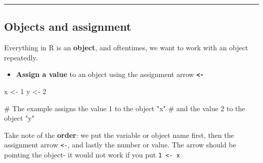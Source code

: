 \documentclass[
  letterpaper,
  DIV=11,
  numbers=noendperiod]{scrartcl}
\newenvironment{Shaded}{\begin{snugshade}}{\end{snugshade}}
\newcommand{\CommentTok}[1]{\textcolor[rgb]{0.37,0.37,0.37}{#1}}
\newcommand{\DecValTok}[1]{\textcolor[rgb]{0.68,0.00,0.00}{#1}}
\newcommand{\NormalTok}[1]{\textcolor[rgb]{0.00,0.23,0.31}{#1}}
\newcommand{\OtherTok}[1]{\textcolor[rgb]{0.00,0.23,0.31}{#1}}
\providecommand{\tightlist}{%
  \setlength{\itemsep}{0pt}\setlength{\parskip}{0pt}}
\begin{document}
\begin{center}\rule{0.5\linewidth}{0.5pt}\end{center}

\subsection{Objects and assignment}\label{objects-and-assignment-1}

Everything in R is an \textbf{object}, and oftentimes, we want to work
with an object repeatedly.

\begin{itemize}
\tightlist
\item
  \textbf{Assign a value} to an object using the assignment arrow
  \textbf{\texttt{\textless{}-}}
\end{itemize}

\begin{Shaded}
\begin{Highlighting}[]
\NormalTok{x }\OtherTok{\textless{}{-}} \DecValTok{1}
\NormalTok{y }\OtherTok{\textless{}{-}} \DecValTok{2}

\CommentTok{\# The example assigns the value 1 to the object "x" }
\CommentTok{\# and the value 2 to the object "y"}
\end{Highlighting}
\end{Shaded}

\begin{tcolorbox}[enhanced jigsaw, arc=.35mm, bottomrule=.15mm, bottomtitle=1mm, breakable, colback=white, colbacktitle=quarto-callout-important-color!10!white, colframe=quarto-callout-important-color-frame, coltitle=black, left=2mm, leftrule=.75mm, opacityback=0, opacitybacktitle=0.6, rightrule=.15mm, title=\textcolor{quarto-callout-important-color}{\faExclamation}\hspace{0.5em}{The assignment arrow points to the object}, titlerule=0mm, toprule=.15mm, toptitle=1mm]

Take note of the \textbf{order}: we put the variable or object name
first, then the assignment arrow \texttt{\textless{}-}, and lastly the
number or value. The arrow should be pointing the object- it would not
work if you put \texttt{1\ \textless{}-\ x}

\end{tcolorbox}
\end{document}
